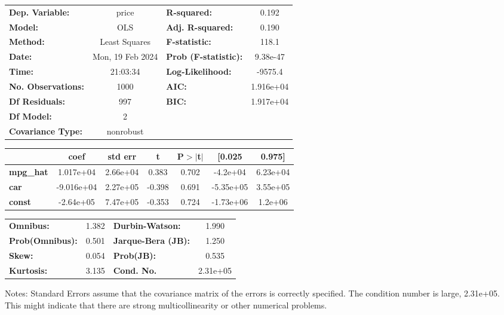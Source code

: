 \begin{center}
\begin{tabular}{lclc}
\toprule
\textbf{Dep. Variable:}    &      price       & \textbf{  R-squared:         } &     0.192   \\
\textbf{Model:}            &       OLS        & \textbf{  Adj. R-squared:    } &     0.190   \\
\textbf{Method:}           &  Least Squares   & \textbf{  F-statistic:       } &     118.1   \\
\textbf{Date:}             & Mon, 19 Feb 2024 & \textbf{  Prob (F-statistic):} &  9.38e-47   \\
\textbf{Time:}             &     21:03:34     & \textbf{  Log-Likelihood:    } &   -9575.4   \\
\textbf{No. Observations:} &        1000      & \textbf{  AIC:               } & 1.916e+04   \\
\textbf{Df Residuals:}     &         997      & \textbf{  BIC:               } & 1.917e+04   \\
\textbf{Df Model:}         &           2      & \textbf{                     } &             \\
\textbf{Covariance Type:}  &    nonrobust     & \textbf{                     } &             \\
\bottomrule
\end{tabular}
\begin{tabular}{lcccccc}
                  & \textbf{coef} & \textbf{std err} & \textbf{t} & \textbf{P$> |$t$|$} & \textbf{[0.025} & \textbf{0.975]}  \\
\midrule
\textbf{mpg\_hat} &    1.017e+04  &     2.66e+04     &     0.383  &         0.702        &     -4.2e+04    &     6.23e+04     \\
\textbf{car}      &   -9.016e+04  &     2.27e+05     &    -0.398  &         0.691        &    -5.35e+05    &     3.55e+05     \\
\textbf{const}    &    -2.64e+05  &     7.47e+05     &    -0.353  &         0.724        &    -1.73e+06    &      1.2e+06     \\
\bottomrule
\end{tabular}
\begin{tabular}{lclc}
\textbf{Omnibus:}       &  1.382 & \textbf{  Durbin-Watson:     } &    1.990  \\
\textbf{Prob(Omnibus):} &  0.501 & \textbf{  Jarque-Bera (JB):  } &    1.250  \\
\textbf{Skew:}          &  0.054 & \textbf{  Prob(JB):          } &    0.535  \\
\textbf{Kurtosis:}      &  3.135 & \textbf{  Cond. No.          } & 2.31e+05  \\
\bottomrule
\end{tabular}
\end{center}

Notes: \newline
 [1] Standard Errors assume that the covariance matrix of the errors is correctly specified. \newline
 [2] The condition number is large, 2.31e+05. This might indicate that there are \newline
 strong multicollinearity or other numerical problems.